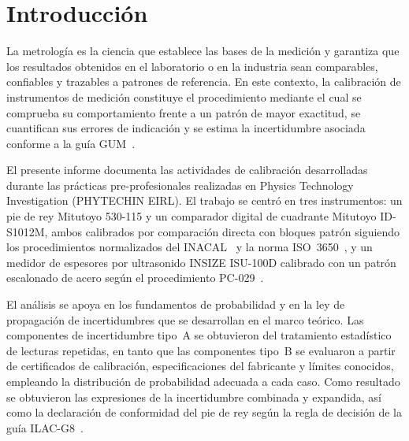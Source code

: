 \section{Introducción}

La metrología es la ciencia que establece las bases de la medición y garantiza que
los resultados obtenidos en el laboratorio o en la industria sean comparables,
confiables y trazables a patrones de referencia. En este contexto, la calibración
de instrumentos de medición constituye el procedimiento mediante el cual se
comprueba su comportamiento frente a un patrón de mayor exactitud, se cuantifican
sus errores de indicación y se estima la incertidumbre asociada conforme a la
guía GUM~\parencite{jcgm2008gum}.

El presente informe documenta las actividades de calibración desarrolladas durante
las prácticas pre-profesionales realizadas en Physics Technology Investigation
(PHYTECHIN EIRL). El trabajo se centró en tres instrumentos: un pie de rey
Mitutoyo 530-115 y un comparador digital de cuadrante Mitutoyo ID-S1012M, ambos
calibrados por comparación directa con bloques patrón siguiendo los procedimientos
normalizados del INACAL~\parencite{inacal_pc012,inacal_pc014} y la norma
ISO~3650~\parencite{iso3650_1998}, y un medidor de espesores por ultrasonido
INSIZE ISU-100D calibrado con un patrón escalonado de acero según el procedimiento
PC-029~\parencite{inacal_pc029}.

El análisis se apoya en los fundamentos de probabilidad y en la ley de propagación
de incertidumbres que se desarrollan en el marco teórico. Las componentes de
incertidumbre tipo~A se obtuvieron del tratamiento estadístico de lecturas
repetidas, en tanto que las componentes tipo~B se evaluaron a partir de
certificados de calibración, especificaciones del fabricante y límites conocidos,
empleando la distribución de probabilidad adecuada a cada caso. Como resultado se
obtuvieron las expresiones de la incertidumbre combinada y expandida, así como la
declaración de conformidad del pie de rey según la regla de decisión de la guía
ILAC-G8~\parencite{ilac2019decision}.
